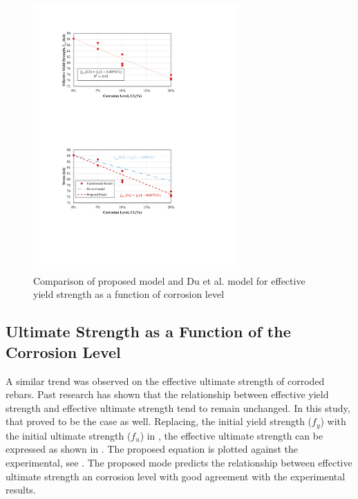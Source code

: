 \begin{figure}[htbp]
	\centering
	\includegraphics[width=0.7\textwidth]{VAC Thesis 2.0/Chapter-4/figs/TensionTest_results_3_proposedmodel.pdf}
	\caption{Comparison of proposed model and Du et al. model \cite{Du2005} for effective yield strength as a function of corrosion level}
	\label{fig:Calderon_vs_Du}
\end{figure}

\newpage

\subsection{Ultimate Strength as a Function of the Corrosion Level}

A similar trend was observed on the effective ultimate strength of corroded rebars. Past research has shown that the relationship between effective yield strength and effective ultimate strength tend to remain unchanged. In this study, that proved to be the case as well. Replacing, the initial yield strength ($f_y$) with the initial ultimate strength ($f_u$) in , the effective ultimate strength can be expressed as shown in . The proposed equation is plotted against the experimental, see . The proposed mode predicts the relationship between effective ultimate strength an corrosion level with good agreement with the experimental results.

